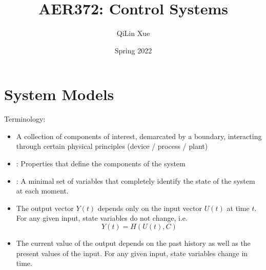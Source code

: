 \documentclass{article}
\title{AER372: Control Systems}
\author{QiLin Xue}
\date{Spring 2022}
\numberwithin{equation}{section}
\begin{document}
\maketitle
\tableofcontents
\newpage
\section{System Models}
Terminology:
\begin{itemize}
    \item {} A collection of components of interest, demarcated by a boundary, interacting through certain physical principles (device / process / plant)
    \item {}: Properties that define the components of the system 
    \item {}: A minimal set of variables that completely identify the state of the system at each moment. 
    \item {} The output vector $Y(t)$ depends only on the input vector $U(t)$ at time $t.$ For any given input, state variables do not change, i.e. 
    \begin{equation}
        Y(t) = H(U(t),C)
    \end{equation}
    \item {} The current value of the output depends on the past history as well as the present values of the input. For any given input, state variables change in time.
\end{itemize}
\end{document}
